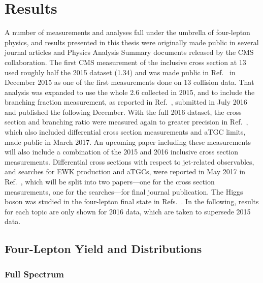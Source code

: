 
\chapter{Results}\label{ch:results}

A number of measurements and analyses fall under the umbrella of four-lepton physics, and results presented in this thesis were originally made public in several journal articles and Physics Analysis Summary documents released by the CMS collaboration.
The first CMS measurement of the {\ZZ} inclusive cross section at {13\TeV} used roughly half the 2015 dataset ({1.34\fbinv}) and was made public in Ref.~\cite{CMS:2015fnj} in December 2015 as one of the first measurements done on {13\TeV} collision data.
That analysis was expanded to use the whole {2.6\fbinv} collected in 2015, and to include the {\Zfourl} branching fraction measurement, as reported in Ref.~\cite{Khachatryan:2016txa}, submitted in July 2016 and published the following December.
With the full 2016 dataset, the {\ZZ} cross section and {\Zfourl} branching ratio were measured again to greater precision in Ref.~\cite{CMS:2017ruh}, which also included differential cross section measurements and aTGC limits, made public in March 2017.
An upcoming paper including these measurements will also include a combination of the 2015 and 2016 inclusive cross section measurements.
Differential cross sections with respect to jet-related observables, and searches for EWK {\ZZ} production and aTGCs, were reported in May 2017 in Ref.~\cite{CMS:2017dyw}, which will be split into two papers---one for the cross section measurements, one for the searches---for final journal publication.
The Higgs boson was studied in the four-lepton final state in Refs.~\cite{CMS:2016rqf,CMS:2016ilx,Sirunyan:2017exp}.
In the following, results for each topic are only shown for 2016 data, which are taken to supersede 2015 data.



\section{Four-Lepton Yield and Distributions}


\subsection{Full Spectrum}

